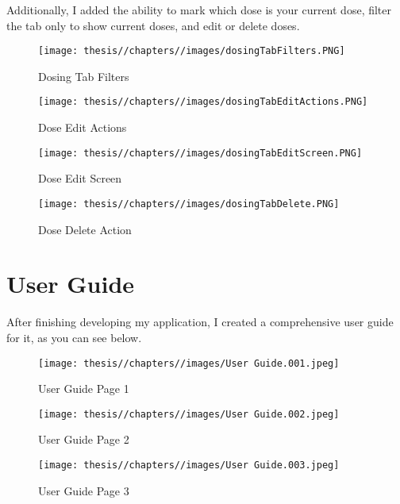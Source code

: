 Additionally, I added the ability to mark which dose is your current dose, filter the tab only to show current doses, and edit or delete doses.

\begin{figure} [H]
    \centering
    \texttt{[image: thesis//chapters//images/dosingTabFilters.PNG]}
    \caption{Dosing Tab Filters}
    \label{fig:enter-label}
\end{figure}

\begin{figure} [H]
    \centering
    \texttt{[image: thesis//chapters//images/dosingTabEditActions.PNG]}
    \caption{Dose Edit Actions}
    \label{fig:enter-label}
\end{figure}

\begin{figure} [H]
    \centering
    \texttt{[image: thesis//chapters//images/dosingTabEditScreen.PNG]}
    \caption{Dose Edit Screen}
    \label{fig:enter-label}
\end{figure}

\begin{figure} [H]
    \centering
    \texttt{[image: thesis//chapters//images/dosingTabDelete.PNG]}
    \caption{Dose Delete Action}
    \label{fig:enter-label}
\end{figure}

\section{User Guide}

After finishing developing my application, I created a comprehensive user guide for it, as you can see below.

\begin{figure} [H]
    \centering
    \texttt{[image: thesis//chapters//images/User Guide.001.jpeg]}
    \caption{User Guide Page 1}
    \label{fig:enter-label}
\end{figure}

\begin{figure} [H]
    \centering
    \texttt{[image: thesis//chapters//images/User Guide.002.jpeg]}
    \caption{User Guide Page 2}
    \label{fig:enter-label}
\end{figure}

\begin{figure} [H]
    \centering
    \texttt{[image: thesis//chapters//images/User Guide.003.jpeg]}
    \caption{User Guide Page 3}
    \label{fig:enter-label}
\end{figure}

